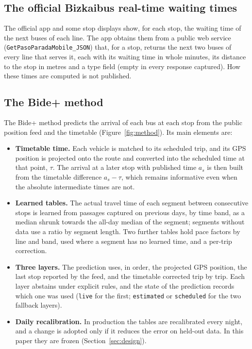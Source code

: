 \subsection{The official Bizkaibus real-time waiting times}

The official app and some stop displays show, for each stop, the waiting time of the next buses of each line. The app
obtains them from a public web service (\texttt{GetPasoParadaMobile\_JSON}) that, for a stop, returns the next two buses of
every line that serves it, each with its waiting time in whole minutes, its distance to the stop in metres and a type
field (empty in every response captured). How these times are computed is not published.

\subsection{The Bide+ method}

The Bide+ method \parencite{garrido2026memoria,garrido2026metodo} predicts the arrival of each bus at each stop from the
public position feed and the timetable (Figure~\ref{fig:method}). Its main elements are:

\begin{itemize}
  \item \textbf{Timetable time.} Each vehicle is matched to its scheduled trip, and its GPS position is projected onto the
        route and converted into the scheduled time at that point, $\tau$. The arrival at a later stop with published time
        $a_s$ is then built from the timetable difference $a_s - \tau$, which remains informative even when the absolute
        intermediate times are not.
  \item \textbf{Learned tables.} The actual travel time of each segment between consecutive stops is learned from passages
        captured on previous days, by time band, as a median shrunk towards the all-day median of the segment; segments
        without data use a ratio by segment length. Two further tables hold pace factors by line and band, used where a
        segment has no learned time, and a per-trip correction.
  \item \textbf{Three layers.} The prediction uses, in order, the projected GPS position, the last stop reported by the
        feed, and the timetable corrected trip by trip. Each layer abstains under explicit rules, and the state of the
        prediction records which one was used (\texttt{live} for the first; \texttt{estimated} or \texttt{scheduled} for
        the two fallback layers).
  \item \textbf{Daily recalibration.} In production the tables are recalibrated every night, and a change is adopted only
        if it reduces the error on held-out data. In this paper they are frozen (Section~\ref{sec:design}).
\end{itemize}


